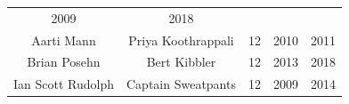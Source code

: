 \documentclass[]{book}
\theoremstyle{definition}
\theoremstyle{definition}
\theoremstyle{definition}
\theoremstyle{remark}
\begin{document}
\begin{longtable}[]{@{}ccccc@{}}
\begin{minipage}[t]{0.14\columnwidth}
2009\strut
\end{minipage} & \begin{minipage}[t]{0.11\columnwidth}\centering\strut
2018\strut
\end{minipage}\tabularnewline
\begin{minipage}[t]{0.22\columnwidth}\centering\strut
Aarti Mann\strut
\end{minipage} & \begin{minipage}[t]{0.28\columnwidth}\centering\strut
Priya Koothrappali\strut
\end{minipage} & \begin{minipage}[t]{0.12\columnwidth}\centering\strut
12\strut
\end{minipage} & \begin{minipage}[t]{0.14\columnwidth}\centering\strut
2010\strut
\end{minipage} & \begin{minipage}[t]{0.11\columnwidth}\centering\strut
2011\strut
\end{minipage}\tabularnewline
\begin{minipage}[t]{0.22\columnwidth}\centering\strut
Brian Posehn\strut
\end{minipage} & \begin{minipage}[t]{0.28\columnwidth}\centering\strut
Bert Kibbler\strut
\end{minipage} & \begin{minipage}[t]{0.12\columnwidth}\centering\strut
12\strut
\end{minipage} & \begin{minipage}[t]{0.14\columnwidth}\centering\strut
2013\strut
\end{minipage} & \begin{minipage}[t]{0.11\columnwidth}\centering\strut
2018\strut
\end{minipage}\tabularnewline
\begin{minipage}[t]{0.22\columnwidth}\centering\strut
Ian Scott Rudolph\strut
\end{minipage} & \begin{minipage}[t]{0.28\columnwidth}\centering\strut
Captain Sweatpants\strut
\end{minipage} & \begin{minipage}[t]{0.12\columnwidth}\centering\strut
12\strut
\end{minipage} & \begin{minipage}[t]{0.14\columnwidth}\centering\strut
2009\strut
\end{minipage} & \begin{minipage}[t]{0.11\columnwidth}\centering\strut
2014\strut
\end{minipage}\tabularnewline
\bottomrule
\end{longtable}
\end{document}
